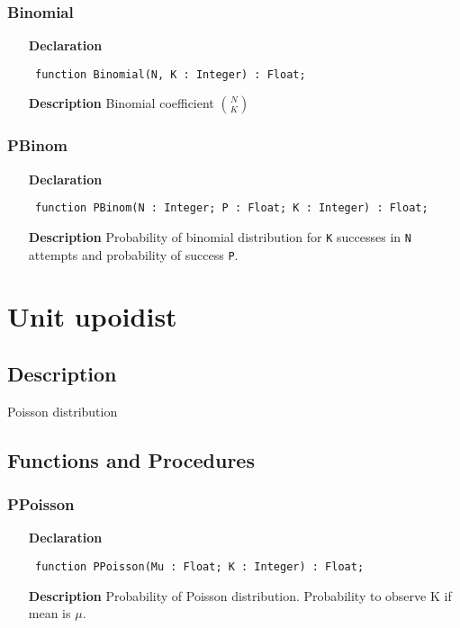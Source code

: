 \documentclass[12pt,a4paper,oneside]{report}
\newcommand{\declarationitem}[1]{\textbf{#1}}
\newcommand{\descriptiontitle}[1]{\textbf{#1}}
\newcommand{\code}[1]{\texttt{#1}}
\begin{document}
\subsubsection{Binomial}
\label{ubinom-Binomial}
\begin{itemize}\item[\declarationitem{Declaration}\hfill]
	\begin{flushleft}
		\code{
			function Binomial(N, K : Integer) : Float;}
	\end{flushleft}
	\item[\descriptiontitle{Description}]
	Binomial coefficient $\binom{N}{K}$
\end{itemize}
\subsubsection{PBinom}
\label{ubinom-PBinom}
\begin{itemize}\item[\declarationitem{Declaration}\hfill]
	\begin{flushleft}
		\code{
			function PBinom(N : Integer; P : Float; K : Integer) : Float;}
	\end{flushleft}
	\item[\descriptiontitle{Description}]
	Probability of binomial distribution for \code{K} successes in \code{N} attempts and probability of success \code{P}. 
\end{itemize}
\section{Unit upoidist}
\label{upoidist}
\subsection{Description}
Poisson distribution 
\subsection{Functions and Procedures}
\subsubsection{PPoisson}
\label{upoidist-PPoisson}
\begin{itemize}\item[\declarationitem{Declaration}\hfill]
	\begin{flushleft}
		\code{
			function PPoisson(Mu : Float; K : Integer) : Float;}
	\end{flushleft}
	\item[\descriptiontitle{Description}]
	Probability of Poisson distribution. Probability to observe K if mean is $\mu$.
\end{itemize}
\end{document}
